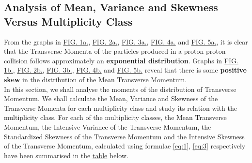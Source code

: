 \documentclass[letterpaper,aps,prc,superscriptaddress,nofootinbib,10pt,showpacs,floatfix]{revtex4-2}%
\begin{document}
\subsection{Analysis of Mean, Variance and Skewness Versus Multiplicity Class}
From the graphs in \hyperref[Fig:1a]{FIG. 1a.}, \hyperref[Fig:2a]{FIG. 2a.}, \hyperref[Fig:3a]{FIG. 3a.}, \hyperref[Fig:4a]{FIG. 4a.} and \hyperref[Fig:5a]{FIG. 5a.}, it is clear that the Transverse Momenta of the particles produced in a proton-proton collision follows approximately an \textbf{exponential distribution}. Graphs in \hyperref[Fig:1b]{FIG. 1b.}, \hyperref[Fig:2b]{FIG. 2b.}, \hyperref[Fig:3b]{FIG. 3b.}, \hyperref[Fig:4b]{FIG. 4b.} and \hyperref[Fig:5b]{FIG. 5b.} reveal that there is some \textbf{positive skew} in the distribution of the Mean Transverse Momentum.
\\
In this section, we shall analyse the moments of the distribution of Transverse Momentum. We shall calculate the Mean, Variance and Skewness of the Transverse Momenta for each multiplicity class and study its relation with the multiplicity class. For each of the multiplicity classes, the Mean Transverse Momentum, the Intensive Variance of the Transverse Momentum, the Standardized Skewness of the Transverse Momentum and the Intensive Skewness of the Transverse Momentum, calculated using formulae \ref{eq:1}, \ref{eq:3} respectively have been summarised in the \hyperref[subsubsec:summary]{table} below.

\newpage
\end{document}
